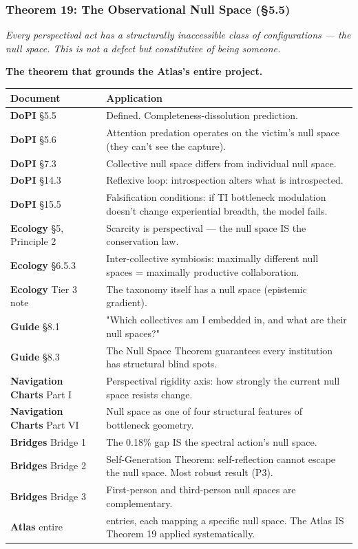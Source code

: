 \subsubsection*{Theorem 19: The Observational Null Space (§5.5)}


\textit{Every perspectival act has a structurally inaccessible class of configurations — the null space. This is not a defect but constitutive of being someone.}


\textbf{The theorem that grounds the Atlas's entire project.}



\begin{longtable}{>{\raggedright\arraybackslash}p{} >{\raggedright\arraybackslash}p{}}
\toprule
\textbf{Document} & \textbf{Application} \\
\midrule
\endhead
\textbf{DoPI} §5.5 & Defined. Completeness-dissolution prediction. \\
\textbf{DoPI} §5.6 & Attention predation operates on the victim's null space (they can't see the capture). \\
\textbf{DoPI} §7.3 & Collective null space differs from individual null space. \\
\textbf{DoPI} §14.3 & Reflexive loop: introspection alters what is introspected. \\
\textbf{DoPI} §15.5 & Falsification conditions: if TI bottleneck modulation doesn't change experiential breadth, the model fails. \\
\textbf{Ecology} §5, Principle 2 & Scarcity is perspectival — the null space IS the conservation law. \\
\textbf{Ecology} §6.5.3 & Inter-collective symbiosis: maximally different null spaces = maximally productive collaboration. \\
\textbf{Ecology} Tier 3 note & The taxonomy itself has a null space (epistemic gradient). \\
\textbf{Guide} §8.1 & "Which collectives am I embedded in, and what are their null spaces?" \\
\textbf{Guide} §8.3 & The Null Space Theorem guarantees every institution has structural blind spots. \\
\textbf{Navigation Charts} Part I & Perspectival rigidity axis: how strongly the current null space resists change. \\
\textbf{Navigation Charts} Part VI & Null space as one of four structural features of bottleneck geometry. \\
\textbf{Bridges} Bridge 1 & The 0.18\% gap IS the spectral action's null space. \\
\textbf{Bridges} Bridge 2 & Self-Generation Theorem: self-reflection cannot escape the null space. Most robust result (P3). \\
\textbf{Bridges} Bridge 3 & First-person and third-person null spaces are complementary. \\
\textbf{Atlas} entire & 92 entries, each mapping a specific null space. The Atlas IS Theorem 19 applied systematically. \\
\bottomrule
\end{longtable}




